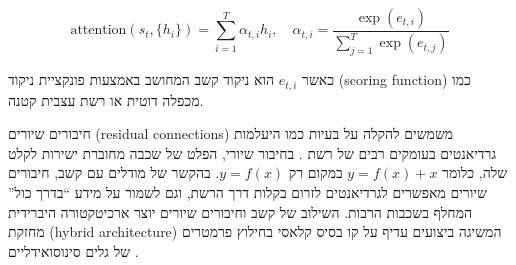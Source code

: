 \begin{equation}
\text{attention}(s_t, \{h_i\}) = \sum_{i=1}^{T} \alpha_{t,i} h_i, \quad \alpha_{t,i} = \frac{\exp(e_{t,i})}{\sum_{j=1}^{T} \exp(e_{t,j})}
\end{equation}

כאשר \(e_{t,i}\) הוא ניקוד קשב המחושב באמצעות פונקציית ניקוד (\textenglish{scoring function}) כמו מכפלה דוטית או רשת עצבית קטנה.

חיבורים שיורים (\textenglish{residual connections}) משמשים להקלה על בעיות כמו היעלמות גרדיאנטים בעומקים רבים של רשת \cite{nachmani2020voice}. בחיבור שיורי, הפלט של שכבה מחוברת ישירות לקלט שלה, כלומר \(y = f(x) + x\) במקום רק \(y = f(x)\). בהקשר של מודלים עם קשב, חיבורים שיורים מאפשרים לגרדיאנטים לזרום בקלות דרך הרשת, וגם לשמור על מידע ``בדרך כול'' המחלף בשכבות הרבות. השילוב של קשב וחיבורים שיורים יוצר ארכיטקטורה היברידית מחזקת (\textenglish{hybrid architecture}) המשיגה ביצועים עדיף על קו בסיס קלאסי בחילוץ פרמטרים של גלים סינוסואידליים \cite{tzinis2020universal}.
